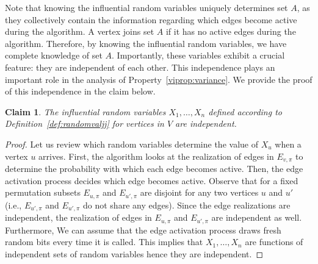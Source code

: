 \documentclass[letterpaper,11pt]{article}
\newtheorem{claim}[lemma]{Claim}
\begin{document}
Note that knowing the influential random variables uniquely determines set $A$, as they collectively contain the information regarding which edges become active during the algorithm. A vertex joins set $A$ if it has no active edges during the algorithm. Therefore, by knowing the influential random variables, we have complete knowledge of set $A$. Importantly, these variables exhibit a crucial feature: they are independent of each other. This independence plays an important role in the analysis of Property~\ref{viprop:variance}. We provide the proof of this independence in the claim below.

\begin{claim}
    \label{obs:Fu_properties} 
 The influential random variables  $X_1, \dots, X_n$ defined according to Definition~\ref{def:randomvaljj} for vertices in $V$ are independent.
\end{claim}
\begin{proof}
Let us review which random variables  determine the value of $X_u$ when a vertex $u$ arrives. First, the algorithm looks at the realization of edges in $E_{v, \pi}$ to determine the probability with which each edge  becomes active. Then, the edge activation process decides which edge becomes active. Observe that for a fixed permutation subsets $E_{u, \pi}$ and  $E_{u', \pi}$  are disjoint for any two vertices $u$ and $u'$ (i.e., $E_{u', \pi}$ and $E_{u', \pi}$ do not share any edges). Since the edge realizations are independent, the realization of edges in $E_{u, \pi}$ and  $E_{u', \pi}$ are independent as well.  Furthermore, We can assume that the edge activation process draws fresh random bits every time it is called. This implies that $X_1, \dots, X_n$ are functions of independent sets of random variables hence they are independent. 
\end{proof}
\end{document}
